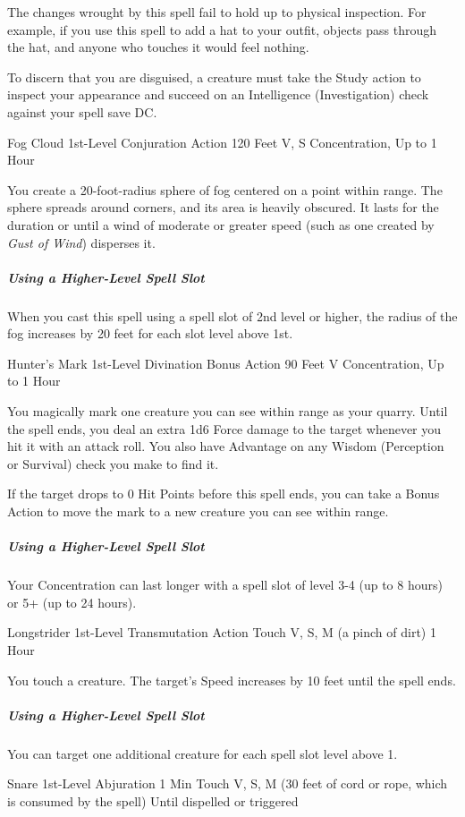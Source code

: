 \documentclass[letterpaper,openany,oneside,twocolumn]{book}
\begin{document}
The changes wrought by this spell fail to hold up to physical inspection. For example, if you use this spell to add a hat to your outfit, objects pass through the hat, and anyone who touches it would feel nothing.

To discern that you are disguised, a creature must take the Study action to inspect your appearance and succeed on an Intelligence (Investigation) check against your spell save DC.

\DndSpellHeader
  {Fog Cloud}
  {1st-Level Conjuration}
  {Action}
  {120 Feet}
  {V, S}
  {Concentration, Up to 1 Hour}

You create a 20-foot-radius sphere of fog centered on a point within range. The sphere spreads around corners, and its area is heavily obscured. It lasts for the duration or until a wind of moderate or greater speed (such as one created by \textit{Gust of Wind}) disperses it.

\subparagraph*{Using a Higher-Level Spell Slot} When you cast this spell using a spell slot of 2nd level or higher, the radius of the fog increases by 20 feet for each slot level above 1st.

\DndSpellHeader
  {Hunter's Mark}
  {1st-Level Divination}
  {Bonus Action}
  {90 Feet}
  {V}
  {Concentration, Up to 1 Hour}

You magically mark one creature you can see within range as your quarry. Until the spell ends, you deal an extra 1d6 Force damage to the target whenever you hit it with an attack roll. You also have Advantage on any Wisdom (Perception or Survival) check you make to find it.

If the target drops to 0 Hit Points before this spell ends, you can take a Bonus Action to move the mark to a new creature you can see within range.

\subparagraph*{Using a Higher-Level Spell Slot} Your Concentration can last longer with a spell slot of level 3-4 (up to 8 hours) or 5+ (up to 24 hours).

\DndSpellHeader
  {Longstrider}
  {1st-Level Transmutation}
  {Action}
  {Touch}
  {V, S, M (a pinch of dirt)}
  {1 Hour}

You touch a creature. The target's Speed increases by 10 feet until the spell ends.

\subparagraph*{Using a Higher-Level Spell Slot} You can target one additional creature for each spell slot level above 1.

\DndSpellHeader
  {Snare}
  {1st-Level Abjuration}
  {1 Min}
  {Touch}
  {V, S, M (30 feet of cord or rope, which is consumed by the spell)}
  {Until dispelled or triggered}
\end{document}
